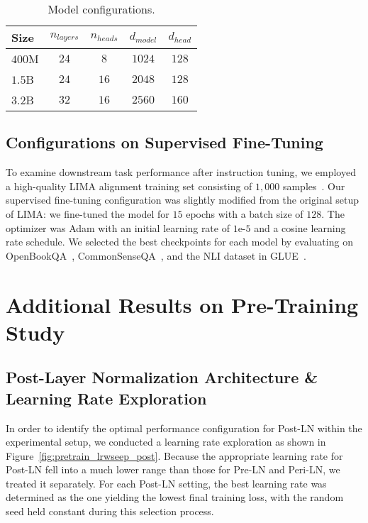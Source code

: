 \begin{table}[ht]
    \centering
    \caption{Model configurations.}
    \label{tab:modelsize}
    \begin{tabular}{lcccc}
    \toprule
        Size & $n_{layers}$ & $n_{heads}$ & $d_{model}$ & $d_{head}$\\
    \toprule
        $400$M & $24$ & $8$ & $1024$ & $128$ \\ 
        $1.5$B & $24$ & $16$ & $2048$ & $128$  \\ 
        $3.2$B & $32$ & $16$ & $2560$ & $160$ \\ 
        \bottomrule
    \end{tabular}
\end{table}

\subsection{Configurations on Supervised Fine-Tuning}\label{appendix:SFTsetup}
 To examine downstream task performance after instruction tuning, we employed a high-quality LIMA alignment training set consisting of $1,000$ samples~\citep{lima}. Our supervised fine-tuning configuration was slightly modified from the original setup of LIMA: we fine-tuned the model for $15$ epochs with a batch size of $128$. The optimizer was Adam with an initial learning rate of $1$e-$5$ and a cosine learning rate schedule. We selected the best checkpoints for each model by evaluating on OpenBookQA~\citep{OpenBookQA2018}, CommonSenseQA~\citep{talmor-etal-2019-commonsenseqa}, and the NLI dataset in GLUE~\citep{wang-etal-2018-glue}.


\newpage
\section{Additional Results on Pre-Training Study} \label{appendix:additionalresults_pretraining}

\subsection{Post-Layer Normalization Architecture \& Learning Rate Exploration} \label{appendix:postln}
In order to identify the optimal performance configuration for Post-LN within the experimental setup, we conducted a learning rate exploration as shown in Figure~\ref{fig:pretrain_lrwseep_post}. Because the appropriate learning rate for Post-LN fell into a much lower range than those for Pre-LN and Peri-LN, we treated it separately. For each Post-LN setting, the best learning rate was determined as the one yielding the lowest final training loss, with the random seed held constant during this selection process.


